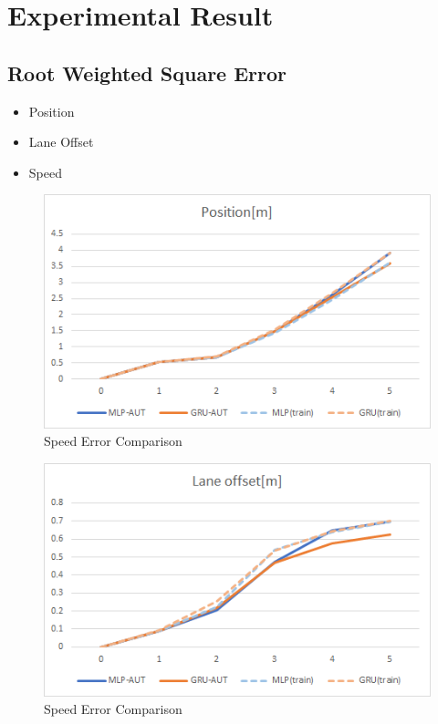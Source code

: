 \chapter{Experimental Result}
\label{chapter:Experimental_Result}


\section{Root Weighted Square Error}

\begin{itemize}
\item Position
\item Lane Offset
\item Speed
\end{itemize}

\begin{figure}[H]
\begin{center}
\includegraphics[width=14cm]{./figures/graph_position.png}
\caption{Speed Error Comparison}
\label{fig:graph_position}
\end{center}
\end{figure}

\begin{figure}[H]
\begin{center}
\includegraphics[width=14cm]{./figures/graph_lane.png}
\caption{Speed Error Comparison}
\label{fig:graph_lane}
\end{center}
\end{figure}

